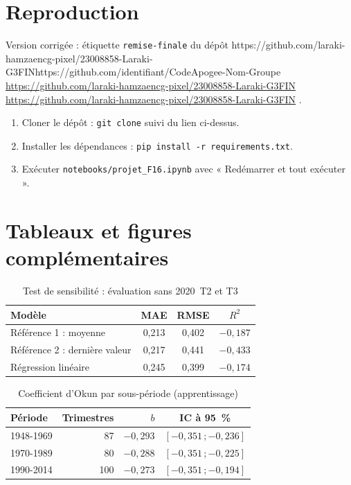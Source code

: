 \documentclass[11pt,a4paper]{article}
\newcounter{nbacompleter}
\newcommand{\lienDepot}{https://github.com/laraki-hamzaencg-pixel/23008858-Laraki-G3FIN}
\newcommand{\lienParDefaut}{https://github.com/identifiant/CodeApogee-Nom-Groupe}
\newcommand{\afficherlien}{%
  \ifx\lienDepot\lienParDefaut
    \stepcounter{nbacompleter}\textcolor{red}{\expandafter\url\expandafter{\lienDepot}}%
  \else
    \expandafter\url\expandafter{\lienDepot}%
  \fi}
\begin{document}
\appendix

\section{Reproduction}
\label{ann:reproduction}
Version corrigée : étiquette \texttt{remise-finale} du dépôt \afficherlien.
\begin{enumerate}
  \item Cloner le dépôt : \texttt{git clone} suivi du lien ci-dessus.
  \item Installer les dépendances : \texttt{pip install -r requirements.txt}.
  \item Exécuter \texttt{notebooks/projet\_F16.ipynb} avec « Redémarrer et tout exécuter ».
\end{enumerate}

\section{Tableaux et figures complémentaires}
\label{ann:complements}
\begin{table}[htbp]
  \centering
  \caption{Test de sensibilité : évaluation sans 2020~T2 et T3}
  \label{tab:sensibilite}
  \small
  \begin{tabular}{@{}l c c c@{}}
    \toprule
    Modèle & MAE & RMSE & $R^2$ \\
    \midrule
    Référence 1 : moyenne & 0,213 & 0,402 & $-0{,}187$ \\
    Référence 2 : dernière valeur & 0,217 & 0,441 & $-0{,}433$ \\
    Régression linéaire & 0,245 & 0,399 & $-0{,}174$ \\
    \bottomrule
  \end{tabular}
\end{table}

\begin{table}[htbp]
  \centering
  \caption{Coefficient d'Okun par sous-période (apprentissage)}
  \label{tab:stabilite}
  \small
  \begin{tabular}{@{}l r r c@{}}
    \toprule
    Période & Trimestres & $b$ & IC à 95~\% \\
    \midrule
    1948-1969 & 87 & $-0{,}293$ & $[-0{,}351\,;-0{,}236]$ \\
    1970-1989 & 80 & $-0{,}288$ & $[-0{,}351\,;-0{,}225]$ \\
    1990-2014 & 100 & $-0{,}273$ & $[-0{,}351\,;-0{,}194]$ \\
    \bottomrule
  \end{tabular}
\end{table}
\end{document}
